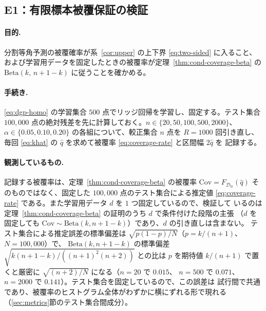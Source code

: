 \documentclass[a4paper,11pt]{jsarticle}
\theoremstyle{definition}
\theoremstyle{plain}
\theoremstyle{remark}
\newcommand{\Dtr}{\mathcal{D}_{\mathrm{tr}}}     %
\newcommand{\qhat}{\hat{q}}
\begin{document}
\subsection{E1：有限標本被覆保証の検証}
\label{sec:e1}

\paragraph{目的.}
分割等角予測の被覆確率が系~\ref{cor:upper} の上下界 \eqref{eq:two-sided} に入ること、
および学習用データを固定したときの被覆率が定理~\ref{thm:cond-coverage-beta} の
$\mathrm{Beta}(k,\,n+1-k)$ に従うことを確かめる。

\paragraph{手続き.}
\eqref{eq:dgp-homo} の学習集合 $500$ 点でリッジ回帰を学習し、固定する。テスト集合
$100{,}000$ 点の絶対残差を先に計算しておく。$n\in\{20,50,100,500,2000\}$、
$\alpha\in\{0.05,0.10,0.20\}$ の各組について、較正集合 $n$ 点を $R=1000$ 回引き直し、
毎回 \eqref{eq:khat} の $\qhat$ を求めて被覆率 \eqref{eq:coverage-rate} と区間幅 $2\qhat$ を
記録する。

\paragraph{観測しているもの.}
記録する被覆率は、定理~\ref{thm:cond-coverage-beta} の被覆率 $\mathrm{Cov}=F_{\Dtr}(\qhat)$
そのものではなく、固定した $100{,}000$ 点のテスト集合による推定値
\eqref{eq:coverage-rate} である。また学習用データ $d$ を $1$ つ固定しているので、検証して
いるのは定理~\ref{thm:cond-coverage-beta} の証明のうち $d$ で条件付けた段階の主張
（$d$ を固定しても $\mathrm{Cov}\sim\mathrm{Beta}(k,n+1-k)$）であり、$d$ の引き直しは含まない。
テスト集合による推定誤差の標準偏差は $\sqrt{p(1-p)/N}$（$p=k/(n+1)$、$N=100{,}000$）で、
$\mathrm{Beta}(k,n+1-k)$ の標準偏差 $\sqrt{k(n+1-k)/((n+1)^2(n+2))}$ との比は
$p$ を期待値 $k/(n+1)$ で置くと厳密に $\sqrt{(n+2)/N}$ になる（$n=20$ で $0.015$、
$n=500$ で $0.071$、$n=2000$ で $0.141$）。テスト集合を固定しているので、この誤差は
試行間で共通であり、被覆率のヒストグラム全体がわずかに横にずれる形で現れる
（\ref{sec:metrics}節のテスト集合間成分）。
\end{document}
